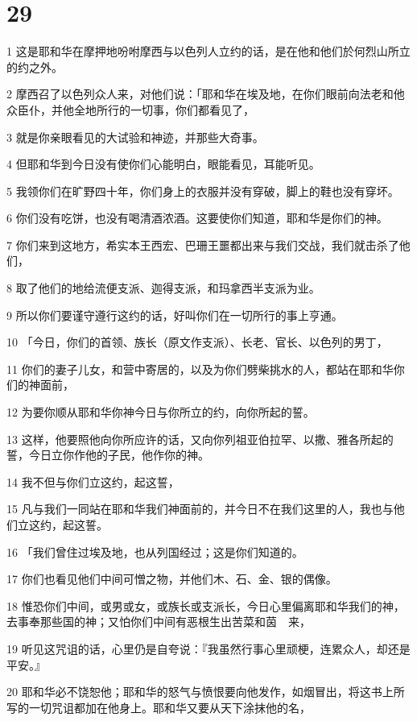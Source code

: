 \chapter{29}

\par 1 这是耶和华在摩押地吩咐摩西与以色列人立约的话，是在他和他们於何烈山所立的约之外。
\par 2 摩西召了以色列众人来，对他们说：「耶和华在埃及地，在你们眼前向法老和他众臣仆，并他全地所行的一切事，你们都看见了，
\par 3 就是你亲眼看见的大试验和神迹，并那些大奇事。
\par 4 但耶和华到今日没有使你们心能明白，眼能看见，耳能听见。
\par 5 我领你们在旷野四十年，你们身上的衣服并没有穿破，脚上的鞋也没有穿坏。
\par 6 你们没有吃饼，也没有喝清酒浓酒。这要使你们知道，耶和华是你们的神。
\par 7 你们来到这地方，希实本王西宏、巴珊王噩都出来与我们交战，我们就击杀了他们，
\par 8 取了他们的地给流便支派、迦得支派，和玛拿西半支派为业。
\par 9 所以你们要谨守遵行这约的话，好叫你们在一切所行的事上亨通。
\par 10 「今日，你们的首领、族长（原文作支派）、长老、官长、以色列的男丁，
\par 11 你们的妻子儿女，和营中寄居的，以及为你们劈柴挑水的人，都站在耶和华你们的神面前，
\par 12 为要你顺从耶和华你神今日与你所立的约，向你所起的誓。
\par 13 这样，他要照他向你所应许的话，又向你列祖亚伯拉罕、以撒、雅各所起的誓，今日立你作他的子民，他作你的神。
\par 14 我不但与你们立这约，起这誓，
\par 15 凡与我们一同站在耶和华我们神面前的，并今日不在我们这里的人，我也与他们立这约，起这誓。
\par 16 「我们曾住过埃及地，也从列国经过；这是你们知道的。
\par 17 你们也看见他们中间可憎之物，并他们木、石、金、银的偶像。
\par 18 惟恐你们中间，或男或女，或族长或支派长，今日心里偏离耶和华我们的神，去事奉那些国的神；又怕你们中间有恶根生出苦菜和茵　来，
\par 19 听见这咒诅的话，心里仍是自夸说：『我虽然行事心里顽梗，连累众人，却还是平安。』
\par 20 耶和华必不饶恕他；耶和华的怒气与愤恨要向他发作，如烟冒出，将这书上所写的一切咒诅都加在他身上。耶和华又要从天下涂抹他的名，
